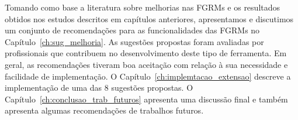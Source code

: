 Tomando como base a literatura sobre melhorias nas FGRMs e os resultados obtidos
nos estudos descritos em capítulos anteriores, apresentamos e discutimos um
conjunto de recomendações para as funcionalidades das FGRMs no
Capítulo~\ref{ch:sug_melhoria}. As sugestões propostas foram avaliadas por
profissionais que contribuem no desenvolvimento deste tipo de ferramenta. Em
geral, as recomendações tiveram boa aceitação com relação à sua necessidade e
facilidade de implementação. O Capítulo~\ref{ch:implemtacao_extensao} descreve a
implementação de uma das 8 sugestões propostas. O
Capítulo~\ref{ch:conclusao_trab_futuros} apresenta uma discussão final e também
apresenta algumas recomendações de trabalhos futuros.

